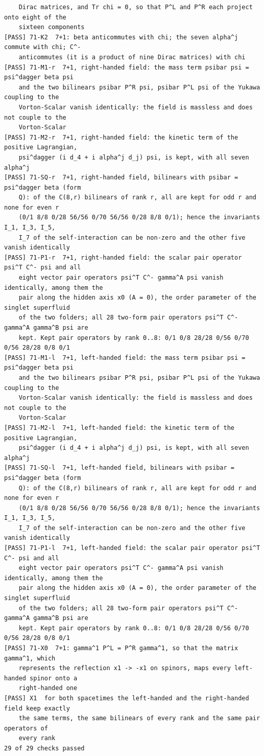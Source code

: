 \documentclass[
  10pt,
]{article}
\begin{document}
\begin{verbatim}
    Dirac matrices, and Tr chi = 0, so that P^L and P^R each project onto eight of the
    sixteen components
[PASS] 71-K2  7+1: beta anticommutes with chi; the seven alpha^j commute with chi; C^-
    anticommutes (it is a product of nine Dirac matrices) with chi
[PASS] 71-M1-r  7+1, right-handed field: the mass term psibar psi = psi^dagger beta psi
    and the two bilinears psibar P^R psi, psibar P^L psi of the Yukawa coupling to the
    Vorton-Scalar vanish identically: the field is massless and does not couple to the
    Vorton-Scalar
[PASS] 71-M2-r  7+1, right-handed field: the kinetic term of the positive Lagrangian,
    psi^dagger (i d_4 + i alpha^j d_j) psi, is kept, with all seven alpha^j
[PASS] 71-SQ-r  7+1, right-handed field, bilinears with psibar = psi^dagger beta (form
    Q): of the C(8,r) bilinears of rank r, all are kept for odd r and none for even r
    (0/1 8/8 0/28 56/56 0/70 56/56 0/28 8/8 0/1); hence the invariants I_1, I_3, I_5,
    I_7 of the self-interaction can be non-zero and the other five vanish identically
[PASS] 71-P1-r  7+1, right-handed field: the scalar pair operator psi^T C^- psi and all
    eight vector pair operators psi^T C^- gamma^A psi vanish identically, among them the
    pair along the hidden axis x0 (A = 0), the order parameter of the singlet superfluid
    of the two folders; all 28 two-form pair operators psi^T C^- gamma^A gamma^B psi are
    kept. Kept pair operators by rank 0..8: 0/1 0/8 28/28 0/56 0/70 0/56 28/28 0/8 0/1
[PASS] 71-M1-l  7+1, left-handed field: the mass term psibar psi = psi^dagger beta psi
    and the two bilinears psibar P^R psi, psibar P^L psi of the Yukawa coupling to the
    Vorton-Scalar vanish identically: the field is massless and does not couple to the
    Vorton-Scalar
[PASS] 71-M2-l  7+1, left-handed field: the kinetic term of the positive Lagrangian,
    psi^dagger (i d_4 + i alpha^j d_j) psi, is kept, with all seven alpha^j
[PASS] 71-SQ-l  7+1, left-handed field, bilinears with psibar = psi^dagger beta (form
    Q): of the C(8,r) bilinears of rank r, all are kept for odd r and none for even r
    (0/1 8/8 0/28 56/56 0/70 56/56 0/28 8/8 0/1); hence the invariants I_1, I_3, I_5,
    I_7 of the self-interaction can be non-zero and the other five vanish identically
[PASS] 71-P1-l  7+1, left-handed field: the scalar pair operator psi^T C^- psi and all
    eight vector pair operators psi^T C^- gamma^A psi vanish identically, among them the
    pair along the hidden axis x0 (A = 0), the order parameter of the singlet superfluid
    of the two folders; all 28 two-form pair operators psi^T C^- gamma^A gamma^B psi are
    kept. Kept pair operators by rank 0..8: 0/1 0/8 28/28 0/56 0/70 0/56 28/28 0/8 0/1
[PASS] 71-X0  7+1: gamma^1 P^L = P^R gamma^1, so that the matrix gamma^1, which
    represents the reflection x1 -> -x1 on spinors, maps every left-handed spinor onto a
    right-handed one
[PASS] X1  for both spacetimes the left-handed and the right-handed field keep exactly
    the same terms, the same bilinears of every rank and the same pair operators of
    every rank
29 of 29 checks passed
\end{verbatim}
\end{document}
